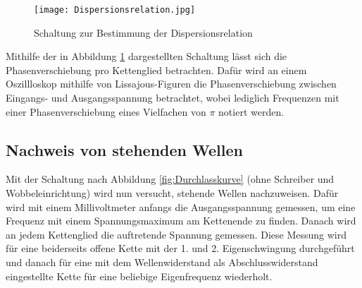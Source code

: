\begin{figure}
  \texttt{[image: Dispersionsrelation.jpg]}
  \caption{Schaltung zur Bestimmung der Dispersionsrelation \cite{anleitung01}}
  \label{fig:Dispersion}
\end{figure}

Mithilfe der in Abbildung \ref{fig:Dispersion} dargestellten Schaltung lässt sich
die Phasenverschiebung
pro Kettenglied betrachten. Dafür wird an einem Oszillloskop mithilfe von Lissajous-Figuren
die Phasenverschiebung zwischen Eingangs- und Ausgangsspannung betrachtet, wobei
lediglich Frequenzen mit einer Phasenverschiebung eines Vielfachen von $\pi$
notiert werden.


\subsection{Nachweis von stehenden Wellen}

Mit der Schaltung nach Abbildung \ref{fig:Durchlasskurve} (ohne Schreiber und Wobbeleinrichtung) wird
nun versucht, stehende Wellen nachzuweisen.
Dafür wird mit einem Millivoltmeter anfangs die Ausgangsspannung gemessen, um eine
Frequenz mit einem Spannungsmaximum am Kettenende zu finden. Danach wird an jedem
Kettenglied die auftretende Spannung gemessen. Diese Messung wird für eine
beiderseits offene Kette mit der 1. und 2. Eigenschwingung durchgeführt und danach
für eine mit dem Wellenwiderstand als Abschlusswiderstand eingestellte Kette
für eine beliebige Eigenfrequenz wiederholt.

\newpage



\printbibliography


